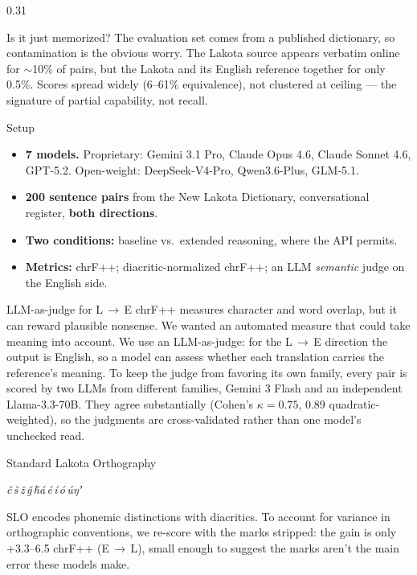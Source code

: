 \documentclass[final]{beamer}
\newcommand{\lak}[1]{\textit{#1}}
\begin{document}
\begin{frame}[t]
\begin{columns}[t]
\begin{column}{0.31\paperwidth}
\begin{block}{Is it just memorized?}
The evaluation set comes from a published dictionary, so contamination is the obvious worry. The Lakota source appears verbatim online for ${\sim}$10\% of pairs, but the Lakota and its English reference together for only 0.5\%. Scores spread widely (6--61\% equivalence), not clustered at ceiling --- the signature of partial capability, not recall.
\end{block}

\begin{block}{Setup}
\begin{itemize}
\item \textbf{7 models.} Proprietary: Gemini 3.1 Pro, Claude Opus 4.6, Claude Sonnet 4.6, GPT-5.2. Open-weight: DeepSeek-V4-Pro, Qwen3.6-Plus, GLM-5.1.
\item \textbf{200 sentence pairs} from the New Lakota Dictionary, conversational register, \textbf{both directions}.
\item \textbf{Two conditions:} baseline vs.\ extended reasoning, where the API permits.
\item \textbf{Metrics:} chrF++; diacritic-normalized chrF++; an LLM \emph{semantic} judge on the English side.
\end{itemize}
\end{block}

\begin{block}{LLM-as-judge for L\,$\rightarrow$\,E}
chrF++ measures character and word overlap, but it can reward plausible nonsense. We wanted an automated measure that could take meaning into account. We use an LLM-as-judge: for the L\,$\rightarrow$\,E direction the output is English, so a model can assess whether each translation carries the reference's meaning. To keep the judge from favoring its own family, every pair is scored by two LLMs from different families, Gemini 3 Flash and an independent Llama-3.3-70B. They agree substantially (Cohen's $\kappa=0.75$, 0.89 quadratic-weighted), so the judgments are cross-validated rather than one model's unchecked read.
\end{block}

\begin{block}{Standard Lakota Orthography}
\begin{center}{\Large \lak{č}\,\lak{š}\,\lak{ž}\,\lak{ǧ}\,\lak{ȟ}\quad\lak{á}\,\lak{é}\,\lak{í}\,\lak{ó}\,\lak{ú}\quad\lak{ŋ}\quad\lak{ʼ}}\end{center}
SLO encodes phonemic distinctions with diacritics. To account for variance in orthographic conventions, we re-score with the marks stripped: the gain is only +3.3--6.5 chrF++ (E\,$\rightarrow$\,L), small enough to suggest the marks aren't the main error these models make.
\end{block}


\end{column}
\end{columns}
\end{frame}
\end{document}
